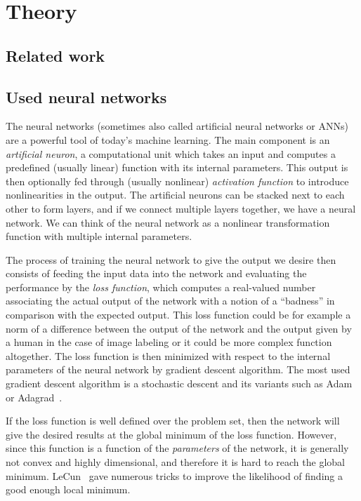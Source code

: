 \chapter{Theory}

\section{Related work}

\section{Used neural networks} \label{nets}

The neural networks (sometimes also called artificial neural networks or ANNs) are a powerful tool of today's machine learning. The main component is an {\em artificial neuron}, a computational unit which takes an input and computes a predefined (usually linear) function with its internal parameters. This output is then optionally fed through (usually nonlinear) {\em activation function} to introduce nonlinearities in the output. The artificial neurons can be stacked next to each other to form layers, and if we connect multiple layers together, we have a neural network. We can think of the neural network as a nonlinear transformation function with multiple internal parameters.

The process of training the neural network to give the output we desire then consists of feeding the input data into the network and evaluating the performance by the {\em loss function}, which computes a real-valued number associating the actual output of the network with a notion of a ``badness'' in comparison with the expected output. This loss function could be for example a norm of a difference between the output of the network and the output given by a human in the case of image labeling or it could be more complex function altogether. The loss function is then minimized with respect to the internal parameters of the neural network by gradient descent algorithm. The most used gradient descent algorithm is a stochastic descent and its variants such as Adam~\cite{adam} or Adagrad~\cite{adagrad}.

If the loss function is well defined over the problem set, then the network will give the desired results at the global minimum of the loss function. However, since this function is a function of the {\em parameters} of the network, it is generally not convex and highly dimensional, and therefore it is hard to reach the global minimum. LeCun~\cite{efbackprop} gave numerous tricks to improve the likelihood of finding a good enough local minimum.


